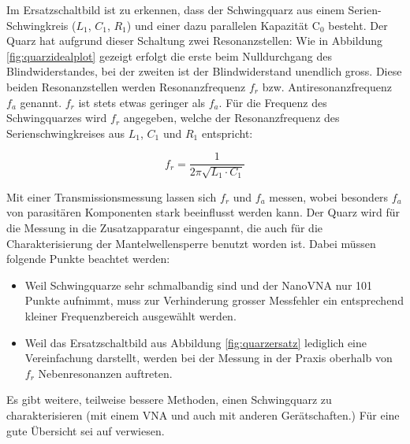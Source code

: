 \documentclass[twoside,a4paper,11pt,halfparskip,DIV=11,notitlepage]{scrartcl}
\begin{document}
Im Ersatzschaltbild ist zu erkennen, dass der Schwingquarz aus einem
Serien-Schwingkreis ($L_1$, $C_1$, $R_1$) und einer dazu parallelen Kapazität
C$_0$ besteht. Der Quarz hat aufgrund dieser Schaltung zwei Resonanzstellen:
Wie in Abbildung \ref{fig:quarzidealplot} gezeigt erfolgt die erste beim
Nulldurchgang des Blindwiderstandes, bei der zweiten ist der Blindwiderstand
unendlich gross. Diese beiden Resonanzstellen werden Resonanzfrequenz $f_r$
bzw. Antiresonanzfrequenz $f_a$ genannt. $f_r$ ist stets etwas geringer als
$f_a$. Für die Frequenz des Schwingquarzes wird $f_r$ angegeben, welche der
Resonanzfrequenz des Serienschwingkreises aus $L_1$, $C_1$ und $R_1$
entspricht:

$$
f_r = \frac{1}{2\pi\sqrt{L_1\cdot C_1}}
$$

Mit einer Transmissionsmessung lassen sich $f_r$ und $f_a$ messen, wobei besonders $f_a$ von parasitären Komponenten
stark beeinflusst werden kann. Der Quarz wird für die Messung in die Zusatzapparatur eingespannt, die auch für die
Charakterisierung der Mantelwellensperre benutzt worden ist. Dabei müssen folgende Punkte beachtet werden:

\begin{itemize}
    \item Weil Schwingquarze sehr schmalbandig sind und der NanoVNA nur 101 Punkte aufnimmt, muss zur Verhinderung grosser Messfehler ein entsprechend kleiner Frequenzbereich ausgewählt werden.
    \item Weil das Ersatzschaltbild aus Abbildung \ref{fig:quarzersatz} lediglich eine Vereinfachung darstellt, werden bei der Messung in der Praxis oberhalb von $f_r$ Nebenresonanzen auftreten.
\end{itemize}

Es gibt weitere, teilweise bessere Methoden, einen Schwingquarz zu charakterisieren (mit einem VNA und auch mit
anderen Gerätschaften.) Für eine gute Übersicht sei auf \cite{kortke2002} verwiesen.
\end{document}
